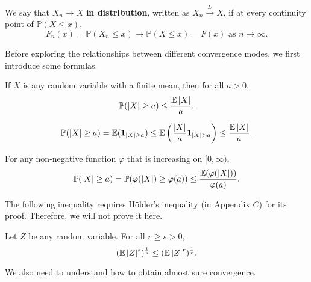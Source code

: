 \documentclass{huhtakm-template-book-v2}
\newcommand{\prob}{\mathbb{P}}
\newcommand{\expect}{\mathbb{E}}
\begin{document}
    \begin{defn}
        We say that $X_{n} \to X$ \textbf{in distribution}, written as $X_{n} \xrightarrow{D} X$, if at every continuity point of $\prob(X \leq x)$,
        \begin{equation*}
            F_{n}(x) = \prob(X_{n} \leq x) \to \prob(X \leq x) = F(x) \text{ as } n \to \infty.
        \end{equation*}
    \end{defn}
    Before exploring the relationships between different convergence modes, we first introduce some formulas.
    \begin{lem}
        If $X$ is any random variable with a finite mean, then for all $a > 0$,
        \begin{equation*}
            \prob(\abs{X} \geq a) \leq \frac{\expect\abs{X}}{a}.
        \end{equation*}
    \end{lem}
    \begin{proofing}
        \begin{equation*}
            \prob(\abs{X} \geq a) = \expect(\mathbf{1}_{\abs{X} \geq a}) \leq \expect\left(\frac{\abs{X}}{a}\mathbf{1}_{\abs{X} > a}\right) \leq \frac{\expect\abs{X}}{a}.
        \end{equation*}
    \end{proofing}
    \begin{rem}
        For any non-negative function $\varphi$ that is increasing on $[0,\infty)$,
        \begin{equation*}
            \prob(\abs{X} \geq a) = \prob(\varphi(\abs{X}) \geq \varphi(a)) \leq \frac{\expect(\varphi(\abs{X}))}{\varphi(a)}.
        \end{equation*}
    \end{rem}
    The following inequality requires H\"older's inequality (in Appendix $C$) for its proof. Therefore, we will not prove it here.
    \begin{lem}
        Let $Z$ be any random variable. For all $r \geq s > 0$,
        \begin{equation*}
            (\expect\abs{Z}^{s})^{\frac{1}{s}} \leq (\expect\abs{Z}^{r})^{\frac{1}{r}}.
        \end{equation*}
    \end{lem}
    We also need to understand how to obtain almost sure convergence.
\end{document}
